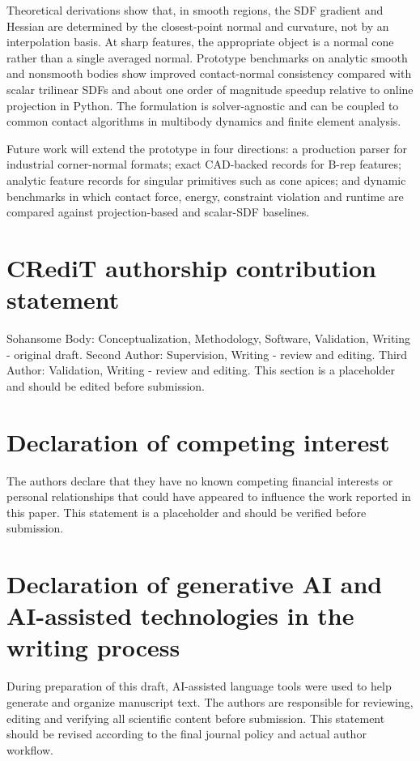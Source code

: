 \documentclass[preprint,12pt,sort&compress]{elsarticle}
\begin{document}
Theoretical derivations show that, in smooth regions, the SDF gradient and Hessian are determined by the closest-point normal and curvature, not by an interpolation basis. At sharp features, the appropriate object is a normal cone rather than a single averaged normal. Prototype benchmarks on analytic smooth and nonsmooth bodies show improved contact-normal consistency compared with scalar trilinear SDFs and about one order of magnitude speedup relative to online projection in Python. The formulation is solver-agnostic and can be coupled to common contact algorithms in multibody dynamics and finite element analysis.

Future work will extend the prototype in four directions: a production parser for industrial corner-normal formats; exact CAD-backed records for B-rep features; analytic feature records for singular primitives such as cone apices; and dynamic benchmarks in which contact force, energy, constraint violation and runtime are compared against projection-based and scalar-SDF baselines.

\section*{CRediT authorship contribution statement}
Sohansome Body: Conceptualization, Methodology, Software, Validation, Writing - original draft. Second Author: Supervision, Writing - review and editing. Third Author: Validation, Writing - review and editing. This section is a placeholder and should be edited before submission.

\section*{Declaration of competing interest}
The authors declare that they have no known competing financial interests or personal relationships that could have appeared to influence the work reported in this paper. This statement is a placeholder and should be verified before submission.

\section*{Declaration of generative AI and AI-assisted technologies in the writing process}
During preparation of this draft, AI-assisted language tools were used to help generate and organize manuscript text. The authors are responsible for reviewing, editing and verifying all scientific content before submission. This statement should be revised according to the final journal policy and actual author workflow.
\end{document}
